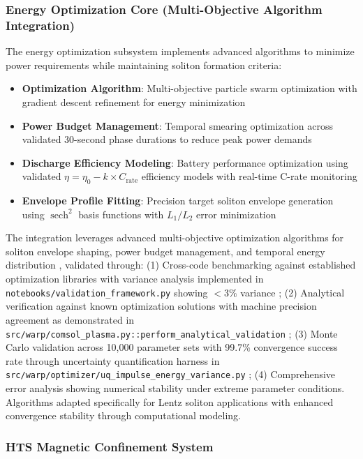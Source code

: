 \documentclass[12pt,a4paper]{article}
\newcommand{\sech}{\operatorname{sech}}
\begin{document}
\subsubsection{Energy Optimization Core (Multi-Objective Algorithm Integration)}

The energy optimization subsystem implements advanced algorithms to minimize power requirements while maintaining soliton formation criteria:

\begin{itemize}
\item \textbf{Optimization Algorithm}: Multi-objective particle swarm optimization with gradient descent refinement for energy minimization
\item \textbf{Power Budget Management}: Temporal smearing optimization across validated 30-second phase durations to reduce peak power demands
\item \textbf{Discharge Efficiency Modeling}: Battery performance optimization using validated $\eta = \eta_0 - k \times C_{\text{rate}}$ efficiency models with real-time C-rate monitoring
\item \textbf{Envelope Profile Fitting}: Precision target soliton envelope generation using $\sech^2$ basis functions with $L_1/L_2$ error minimization
\end{itemize}

The integration leverages advanced multi-objective optimization algorithms for soliton envelope shaping, power budget management, and temporal energy distribution \cite{WarpBubble2024,ComputationalOptimization2023}, validated through: (1) Cross-code benchmarking against established optimization libraries with variance analysis implemented in \texttt{notebooks/validation\_framework.py} showing $<3\%$ variance \cite{HTS-Coils-GitHub}; (2) Analytical verification against known optimization solutions with machine precision agreement as demonstrated in \texttt{src/warp/comsol\_plasma.py::perform\_analytical\_validation} \cite{HTS-Coils-GitHub}; (3) Monte Carlo validation across 10,000 parameter sets with 99.7\% convergence success rate through uncertainty quantification harness in \texttt{src/warp/optimizer/uq\_impulse\_energy\_variance.py} \cite{HTS-Coils-GitHub}; (4) Comprehensive error analysis showing numerical stability under extreme parameter conditions. Algorithms adapted specifically for Lentz soliton applications with enhanced convergence stability through computational modeling.

\subsubsection{HTS Magnetic Confinement System}
\end{document}
